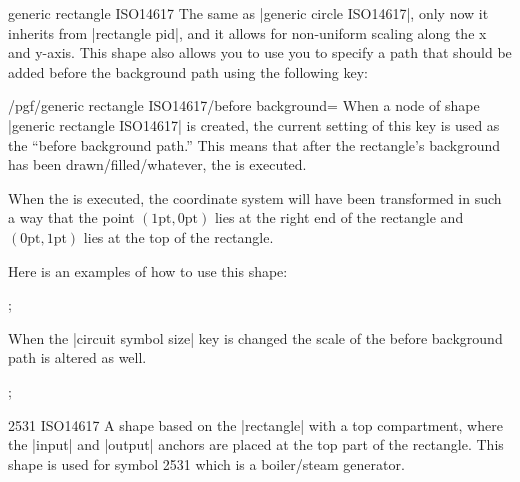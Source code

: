 \documentclass[a4paper]{ltxdoc}
\begin{document}
\begin{shape}{generic rectangle ISO14617}
 The same as |generic circle ISO14617|, only now it inherits from |rectangle pid|, and it allows for non-uniform scaling along the x and y-axis.
 This shape also allows you to use you to specify a path that should be added before the background path using
 the following key:
 \begin{key}{/pgf/generic rectangle ISO14617/before background=}
  When a node of shape |generic rectangle ISO14617| is created, the current
  setting of this key is used as the ``before background path.''
  This means that after the rectangle's background has been
  drawn/filled/whatever, the  is executed.

  When the  is executed, the coordinate system will have
  been transformed in such a way that the point
  $(1\mathrm{pt},0\mathrm{pt})$ lies at the right end of the rectangle
  and $(0\mathrm{pt},1\mathrm{pt})$ lies at the top of the
  rectangle.
 \end{key}
 Here is an examples of how to use this shape:
 \begin{codeexample}[]
  \tikz \node [generic rectangle ISO14617,
   circuit symbol size = width 5 height 5,
   /pgf/generic rectangle ISO14617/before background={
     \pgfpathmoveto{\pgfpoint{-0.5pt}{-0.5pt}}
     \pgfpathlineto{\pgfpoint{1pt}{0pt}}
     \pgfpathlineto{\pgfpoint{0pt}{1pt}}
     \pgfpathlineto{\pgfpoint{-0.5pt}{-0.5pt}}
     \pgfusepath{draw}
    },
   transform shape,
   draw] {};
 \end{codeexample}
 When the |circuit symbol size| key is changed the scale of the before background path is altered as well.
 \begin{codeexample}[]
  \tikz \node [generic rectangle ISO14617,
   circuit symbol size = width 15 height 5,
   /pgf/generic rectangle ISO14617/before background={
     \pgfpathmoveto{\pgfpoint{-0.5pt}{-0.5pt}}
     \pgfpathlineto{\pgfpoint{1pt}{0pt}}
     \pgfpathlineto{\pgfpoint{0pt}{1pt}}
     \pgfpathlineto{\pgfpoint{-0.5pt}{-0.5pt}}
     \pgfusepath{draw}
    },
   transform shape,
   draw] {};
 \end{codeexample}
\end{shape}

\begin{shape}{2531 ISO14617}
 A shape based on the |rectangle| with a top compartment, where the |input| and |output| anchors are placed at the top part of the rectangle. This shape is used for symbol 2531 which is a boiler/steam generator.
 \begin{codeexample}[]
 \end{codeexample}
\end{shape}
\end{document}

